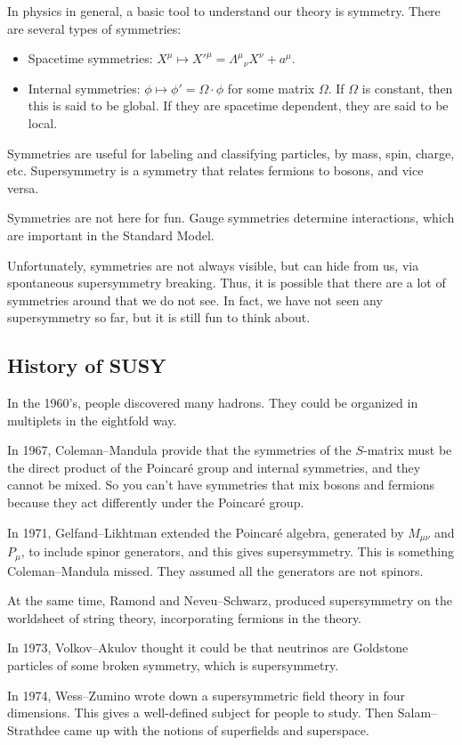 \documentclass[a4paper]{article}
\begin{document}
In physics in general, a basic tool to understand our theory is symmetry. There are several types of symmetries:
\begin{itemize}
  \item Spacetime symmetries: $X^\mu \mapsto X'^\mu = \Lambda^\mu\!_\nu X^\nu + a^\mu$.
  \item Internal symmetries: $\phi \mapsto \phi' = \Omega \cdot \phi$ for some matrix $\Omega$. If $\Omega$ is constant, then this is said to be global. If they are spacetime dependent, they are said to be local.
\end{itemize}
Symmetries are useful for labeling and classifying particles, by mass, spin, charge, etc. Supersymmetry is a symmetry that relates fermions to bosons, and vice versa.

Symmetries are not here for fun. Gauge symmetries determine interactions, which are important in the Standard Model.

Unfortunately, symmetries are not always visible, but can hide from us, via spontaneous supersymmetry breaking. Thus, it is possible that there are a lot of symmetries around that we do not see. In fact, we have not seen any supersymmetry so far, but it is still fun to think about.
\subsection{History of SUSY}
In the 1960's, people discovered many hadrons. They could be organized in multiplets in the eightfold way.

In 1967, Coleman--Mandula provide that the symmetries of the $S$-matrix must be the direct product of the Poincar\'e group and internal symmetries, and they cannot be mixed. So you can't have symmetries that mix bosons and fermions because they act differently under the Poincar\'e group.

In 1971, Gelfand--Likhtman extended the Poincar\'e algebra, generated by $M_{\mu \nu}$ and $P_\mu$, to include spinor generators, and this gives supersymmetry. This is something Coleman--Mandula missed. They assumed all the generators are not spinors.

At the same time, Ramond and Neveu--Schwarz, produced supersymmetry on the worldsheet of string theory, incorporating fermions in the theory.

In 1973, Volkov--Akulov thought it could be that neutrinos are Goldstone particles of some broken symmetry, which is supersymmetry.

In 1974, Wess--Zumino wrote down a supersymmetric field theory in four dimensions. This gives a well-defined subject for people to study. Then Salam--Strathdee came up with the notions of superfields and superspace.
\end{document}
